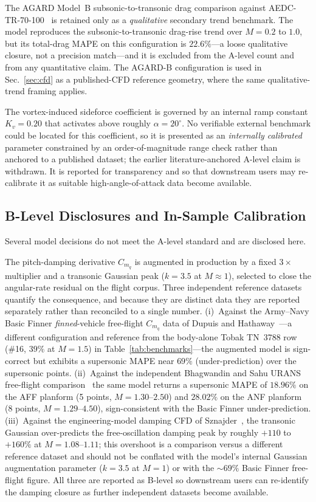 The AGARD Model~B subsonic-to-transonic drag comparison against AEDC-TR-70-100~\cite{anderson1970agardb}
is retained only as a \emph{qualitative} secondary trend benchmark. The model
reproduces the subsonic-to-transonic drag-rise trend over $M = 0.2$ to $1.0$, but
its total-drag MAPE on this configuration is $22.6\%$---a loose qualitative
closure, not a precision match---and it is excluded from the A-level count and
from any quantitative claim. The AGARD-B configuration is used in
Sec.~\ref{sec:cfd} as a published-CFD reference geometry, where the same
qualitative-trend framing applies.

The vortex-induced sideforce coefficient is governed by an internal ramp constant
$K_v = 0.20$ that activates above roughly $\alpha = 20^{\circ}$. No verifiable
external benchmark could be located for this coefficient, so it is presented as
an \emph{internally calibrated} parameter constrained by an order-of-magnitude
range check rather than anchored to a published dataset; the earlier
literature-anchored A-level claim is withdrawn. It is reported for transparency
and so that downstream users may re-calibrate it as suitable high-angle-of-attack
data become available.

\subsection{B-Level Disclosures and In-Sample Calibration}
\label{subsec:b-level}

Several model decisions do not meet the A-level standard and are disclosed here.

The pitch-damping derivative $C_{m_q}$ is augmented in production by a fixed
$3\times$ multiplier and a transonic Gaussian peak ($k = 3.5$ at $M \approx 1$),
selected to close the angular-rate residual on the flight corpus. Three
independent reference datasets quantify the consequence, and because they are
distinct data they are reported separately rather than reconciled to a single
number. (i)~Against the Army--Navy Basic Finner \emph{finned}-vehicle free-flight
$C_{m_q}$ data of Dupuis and Hathaway~\cite{dupuis1997}---a different
configuration and reference from the body-alone Tobak TN~3788 row
(\#16, $39\%$ at $M=1.5$) in Table~\ref{tab:benchmarks}---the augmented model is
sign-correct but exhibits a supersonic MAPE near $69\%$ (under-prediction) over the
supersonic points. (ii)~Against the independent Bhagwandin and Sahu URANS free-flight
comparison~\cite{bhagwandin2013} the same model returns a supersonic MAPE of
$18.96\%$ on the AFF planform (5 points, $M = 1.30$--$2.50$) and $28.02\%$ on the
ANF planform (8 points, $M = 1.29$--$4.50$), sign-consistent with the Basic Finner
under-prediction. (iii)~Against the engineering-model damping CFD of
Sznajder~\cite{sznajder2025}, the transonic Gaussian over-predicts the
free-oscillation damping peak by roughly $+110$ to $+160\%$ at $M = 1.08$--$1.11$;
this overshoot is a comparison versus a different reference dataset and should not
be conflated with the model's internal Gaussian augmentation parameter ($k = 3.5$
at $M = 1$) or with the $\sim 69\%$ Basic Finner free-flight figure. All three are
reported as B-level so downstream users can re-identify the damping closure as
further independent datasets become available.

